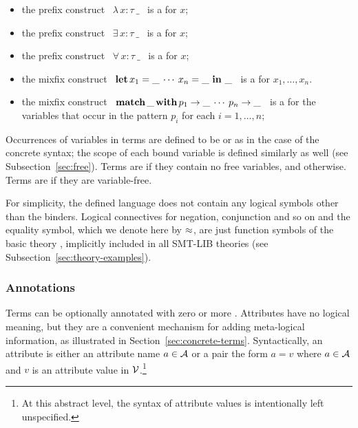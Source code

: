 \begin{itemize}
\item
the prefix construct
\ $\lambda\,x{:}\tau\ \_$ \ is 
a 
for $x$;

\item
the prefix construct
\ $\exists\,x{:}\tau\ \_$ \ is 
a 
for $x$;

\item
the prefix construct
\ $\forall\,x{:}\tau\ \_$ \ is 
a 
for $x$;

\item
the mixfix construct
\ $\textbf{let}\,x_1 = \_\:\cdots\:x_n = \_\ \textbf{in}\ \_$ \ is 
a 
for $x_1, \ldots, x_n$.

\item
the mixfix construct 
\ $\textbf{match}\,\_\,\textbf{with}\,p_1 \to \_\:\cdots\:p_n \to \_$ \ is 
a  for the variables that occur in the pattern $p_i$ for each $i=1,\ldots,n$;

\end{itemize}

Occurrences of variables in terms are defined to be  or
 as in the case of the concrete syntax;
the scope of each bound variable is defined similarly as well
(see Subsection~\ref{sec:free}).
Terms are  
if they contain no free variables, and  otherwise.
Terms are  if they are variable-free.

For simplicity,
the defined language does not contain any logical symbols
other than the binders.
Logical connectives for negation, conjunction and so on 
and the equality symbol, which we denote here by $\approx$,
are just function symbols of the basic theory ,
implicitly included in all SMT-LIB theories
(see Subsection~\ref{sec:theory-examples}). 

\subsubsection{Annotations}

Terms can be optionally annotated with zero or more .
Attributes have no logical meaning, 
but they are a convenient mechanism for adding meta-logical information,
as illustrated in Section~\ref{sec:concrete-terms}. 
Syntactically, 
an attribute is either an attribute name $a \in \mathcal{A}$ or 
a pair the form $a = v$ where 
$a \in \mathcal{A}$ and 
$v$ is an attribute value in $\mathcal{V}$.\footnote{%
At this abstract level,
the syntax of attribute values is intentionally left unspecified.
}

